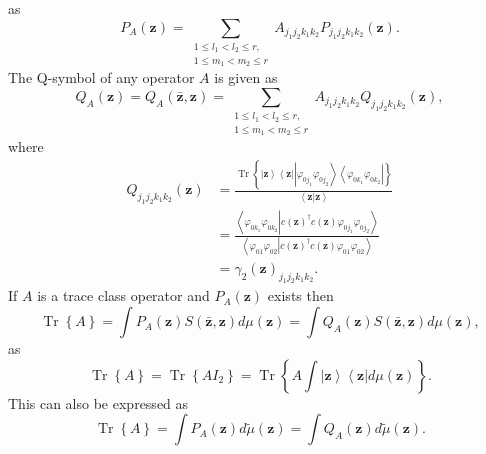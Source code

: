 \documentclass[aps,preprint]{revtex4}%
\begin{document}
as
\begin{equation}
P_{A}\left(  \mathbf{z}\right)  =\sum_{\substack{1\leq l_{1}<l_{2}\leq
r,\\1\leq m_{1}<m_{2}\leq r}}A_{j_{1}j_{2}k_{1}k_{2}}P_{j_{1}j_{2}k_{1}k_{2}%
}\left(  \mathbf{z}\right)  .
\end{equation}
The Q-symbol of any operator $A$ is given as
\begin{equation}
Q_{A}\left(  \mathbf{z}\right)  =Q_{A}\left(  \mathbf{\bar{z},z}\right)
=\sum_{\substack{1\leq l_{1}<l_{2}\leq r,\\1\leq m_{1}<m_{2}\leq r}%
}A_{j_{1}j_{2}k_{1}k_{2}}Q_{j_{1}j_{2}k_{1}k_{2}}\left(  \mathbf{z}\right)  ,
\end{equation}
where
\begin{align}
Q_{j_{1}j_{2}k_{1}k_{2}}\left(  \mathbf{z}\right)   &  =\frac
{\operatorname*{Tr}\left\{  \left\vert \mathbf{z}\right\rangle \left\langle
\mathbf{z}\right\vert \left\vert \varphi_{0j_{1}}\varphi_{0j_{2}}\right\rangle
\left\langle \varphi_{0k_{1}}\varphi_{0k_{2}}\right\vert \right\}
}{\left\langle \mathbf{z}\left\vert \mathbf{z}\right.  \right\rangle
}\nonumber\\
&  =\frac{\left\langle \varphi_{0k_{1}}\varphi_{0k_{2}}\left\vert c\left(
\mathbf{z}\right)  ^{\dagger}c\left(  \mathbf{z}\right)  \varphi_{0j_{1}%
}\varphi_{0j_{2}}\right.  \right\rangle }{\left\langle \varphi_{01}%
\varphi_{02}\left\vert c\left(  \mathbf{z}\right)  ^{\dagger}c\left(
\mathbf{z}\right)  \varphi_{01}\varphi_{02}\right.  \right\rangle }\nonumber\\
&  =\gamma_{2}\left(  \mathbf{z}\right)  _{j_{1}j_{2}k_{1}k_{2}}.
\end{align}
If $A$ is a trace class operator and $P_{A}\left(  \mathbf{z}\right)  $ exists
then
\begin{equation}
\operatorname*{Tr}\left\{  A\right\}  =\int P_{A}\left(  \mathbf{z}\right)
S\left(  \mathbf{\bar{z},z}\right)  d\mu\left(  \mathbf{z}\right)  =\int
Q_{A}\left(  \mathbf{z}\right)  S\left(  \mathbf{\bar{z},z}\right)
d\mu\left(  \mathbf{z}\right)  ,
\end{equation}
as
\begin{equation}
\operatorname*{Tr}\left\{  A\right\}  =\operatorname*{Tr}\left\{
AI_{2}\right\}  =\operatorname*{Tr}\left\{  A\int\left\vert \mathbf{z}%
\right\rangle \left\langle \mathbf{z}\right\vert d\mu\left(  \mathbf{z}%
\right)  \right\}  .
\end{equation}
This can also be expressed as
\begin{equation}
\operatorname*{Tr}\left\{  A\right\}  =\int P_{A}\left(  \mathbf{z}\right)
d\tilde{\mu}\left(  \mathbf{z}\right)  =\int Q_{A}\left(  \mathbf{z}\right)
d\tilde{\mu}\left(  \mathbf{z}\right)  .
\end{equation}
\end{document}
